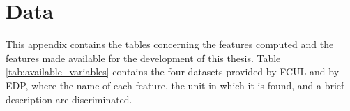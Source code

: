 \chapter{Data}
\label{chapter:appendixE}


This appendix contains the tables concerning the features computed and the features made available for the development of this thesis. Table \ref{tab:available_variables} contains the four datasets provided by \ac{FCUL} and by \ac{EDP}, where the name of each feature, the unit in which it is found, and a brief description are discriminated. 

\newpage
    
